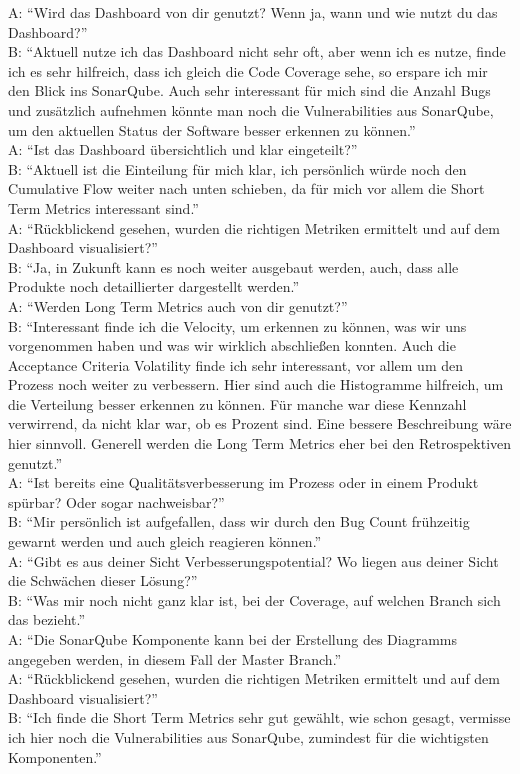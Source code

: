 A\@: ``Wird das Dashboard von dir genutzt? Wenn ja, wann und wie nutzt du das Dashboard?'' \\
B\@: ``Aktuell nutze ich das Dashboard nicht sehr oft, aber wenn ich es nutze, finde ich es sehr hilfreich, dass ich gleich die Code Coverage sehe, so erspare ich mir den Blick ins SonarQube. Auch sehr interessant für mich sind die Anzahl Bugs und zusätzlich aufnehmen könnte man noch die Vulnerabilities aus SonarQube, um den aktuellen Status der Software besser erkennen zu können.'' \\
A\@: ``Ist das Dashboard übersichtlich und klar eingeteilt?'' \\
B\@: ``Aktuell ist die Einteilung für mich klar, ich persönlich würde noch den Cumulative Flow weiter nach unten schieben, da für mich vor allem die Short Term Metrics interessant sind.'' \\
A\@: ``Rückblickend gesehen, wurden die richtigen Metriken ermittelt und auf dem Dashboard visualisiert?'' \\
B\@: ``Ja, in Zukunft kann es noch weiter ausgebaut werden, auch, dass alle Produkte noch detaillierter dargestellt werden.'' \\
A\@: ``Werden Long Term Metrics auch von dir genutzt?'' \\
B\@: ``Interessant finde ich die Velocity, um erkennen zu können, was wir uns vorgenommen haben und was wir wirklich abschließen konnten. Auch die Acceptance Criteria Volatility finde ich sehr interessant, vor allem um den Prozess noch weiter zu verbessern. Hier sind auch die Histogramme hilfreich, um die Verteilung besser erkennen zu können. Für manche war diese Kennzahl verwirrend, da nicht klar war, ob es Prozent sind. Eine bessere Beschreibung wäre hier sinnvoll. Generell werden die Long Term Metrics eher bei den Retrospektiven genutzt.'' \\
A\@: ``Ist bereits eine Qualitätsverbesserung im Prozess oder in einem Produkt spürbar? Oder sogar nachweisbar?'' \\
B\@: ``Mir persönlich ist aufgefallen, dass wir durch den Bug Count frühzeitig gewarnt werden und auch gleich reagieren können.'' \\
A\@: ``Gibt es aus deiner Sicht Verbesserungspotential? Wo liegen aus deiner Sicht die Schwächen dieser Lösung?'' \\
B\@: ``Was mir noch nicht ganz klar ist, bei der Coverage, auf welchen Branch sich das bezieht.'' \\
A\@: ``Die SonarQube Komponente kann bei der Erstellung des Diagramms angegeben werden, in diesem Fall der Master Branch.'' \\
A\@: ``Rückblickend gesehen, wurden die richtigen Metriken ermittelt und auf dem Dashboard visualisiert?'' \\
B\@: ``Ich finde die Short Term Metrics sehr gut gewählt, wie schon gesagt, vermisse ich hier noch die Vulnerabilities aus SonarQube, zumindest für die wichtigsten Komponenten.''
